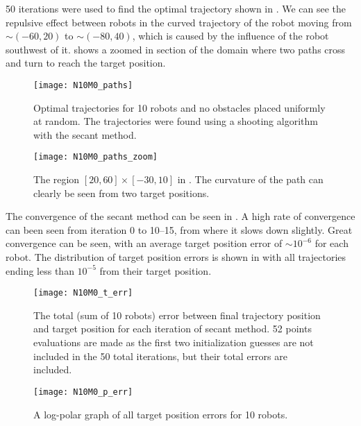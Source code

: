 \documentclass[11pt]{article}
\begin{document}
50 iterations were used to find the optimal trajectory shown in . We can see the repulsive effect between robots in the curved trajectory of the robot moving from \(\sim(-60,20)\) to \(\sim(-80,40)\), which is caused by the influence of the robot southwest of it.  shows a zoomed in section of the domain where two paths cross and turn to reach the target position.

\begin{figure}
	\centering
	\texttt{[image: N10M0\_paths]}
	\caption{Optimal trajectories for 10 robots and no obstacles placed uniformly at random. The trajectories were found using a shooting algorithm with the secant method.}
	\label{fig:n10m0-paths}
\end{figure}

\begin{figure}
	\centering
	\texttt{[image: N10M0\_paths\_zoom]}
	\caption{The region \([20,60] \times [-30,10]\) in . The curvature of the path can clearly be seen from two target positions.}
	\label{fig:n10m0-paths-zoom}
\end{figure}

The convergence of the secant method can be seen in . A high rate of convergence can been seen from iteration 0 to 10--15, from where it slows down slightly. Great convergence can be seen, with an average target position error of \(\sim 10^{-6}\) for each robot. The distribution of target position errors is shown in  with all trajectories ending less than \(10^{-5}\) from their target position.

\begin{figure}
	\centering
	\texttt{[image: N10M0\_t\_err]}
	\caption{The total (sum of 10 robots) error between final trajectory position and target position for each iteration of secant method. 52 points evaluations are made as the first two initialization guesses are not included in the 50 total iterations, but their total errors are included.}
	\label{fig:n10m0-t-err}
\end{figure}

\begin{figure}
	\centering
	\texttt{[image: N10M0\_p\_err]}
	\caption{A log-polar graph of all target position errors for 10 robots.}
	\label{fig:n10m0-p-err}
\end{figure}

\clearpage
\end{document}

